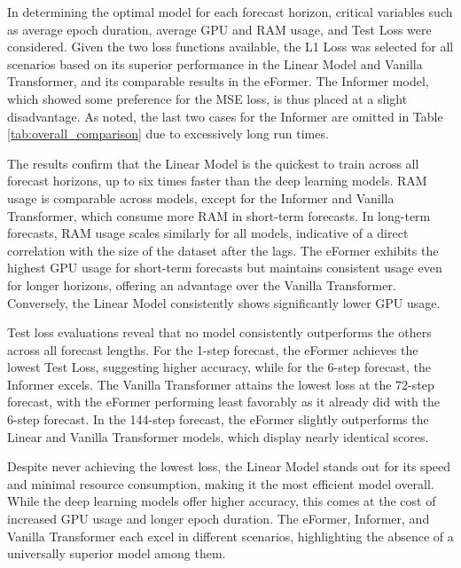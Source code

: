 \documentclass{article}
\begin{document}
In determining the optimal model for each forecast horizon, critical variables such as average epoch duration, average GPU and RAM usage, and Test Loss were considered. Given the two loss functions available, the L1 Loss was selected for all scenarios based on its superior performance in the Linear Model and Vanilla Transformer, and its comparable results in the eFormer. The Informer model, which showed some preference for the MSE loss, is thus placed at a slight disadvantage. As noted, the last two cases for the Informer are omitted in Table \ref{tab:overall_comparison} due to excessively long run times.

The results confirm that the Linear Model is the quickest to train across all forecast horizons, up to six times faster than the deep learning models. RAM usage is comparable across models, except for the Informer and Vanilla Transformer, which consume more RAM in short-term forecasts. In long-term forecasts, RAM usage scales similarly for all models, indicative of a direct correlation with the size of the dataset after the lags. The eFormer exhibits the highest GPU usage for short-term forecasts but maintains consistent usage even for longer horizons, offering an advantage over the Vanilla Transformer. Conversely, the Linear Model consistently shows significantly lower GPU usage.

Test loss evaluations reveal that no model consistently outperforms the others across all forecast lengths. For the 1-step forecast, the eFormer achieves the lowest Test Loss, suggesting higher accuracy, while for the 6-step forecast, the Informer excels. The Vanilla Transformer attains the lowest loss at the 72-step forecast, with the eFormer performing least favorably as it already did with the 6-step forecast. In the 144-step forecast, the eFormer slightly outperforms the Linear and Vanilla Transformer models, which display nearly identical scores.

Despite never achieving the lowest loss, the Linear Model stands out for its speed and minimal resource consumption, making it the most efficient model overall. While the deep learning models offer higher accuracy, this comes at the cost of increased GPU usage and longer epoch duration. The eFormer, Informer, and Vanilla Transformer each excel in different scenarios, highlighting the absence of a universally superior model among them.
\end{document}
